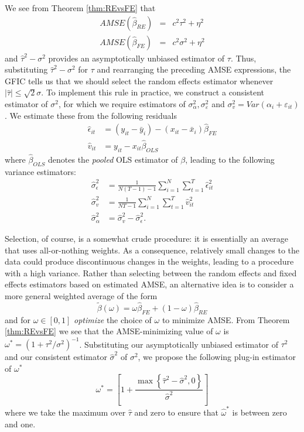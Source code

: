 We see from Theorem \ref{thm:REvsFE} that 
\begin{eqnarray}
  AMSE(\widehat{\beta}_{RE}) &=& c^2 \tau^2 + \eta^2 \\
  \label{eq:REAMSE}
  AMSE(\widehat{\beta}_{FE}) &=& c^2\sigma^2 + \eta^2  
  \label{eq:FEAMSE}
\end{eqnarray}
and $\widehat{\tau}^2 - \sigma^2$ provides an asymptotically unbiased estimator of $\tau$.
Thus, substituting $\widehat{\tau}^2 - \sigma^2$ for $\tau$ and rearranging the preceding AMSE expressions, the GFIC tells us that we should select the random effects estimator whenever $|\widehat{\tau}|\leq \sqrt{2} \sigma$.
To implement this rule in practice, we construct a consistent estimator of $\sigma^2$, for which we require estimators of $\sigma_{\alpha}^2, \sigma_{\varepsilon}^2$ and $\sigma_{v}^2 = Var(\alpha_i + \varepsilon_{it})$.
We estimate these from the following residuals
\begin{align*}
\widehat{\epsilon}_{it}& = (y_{it} -\bar{y}_i) - (x_{it} - \bar{x}_i) \widehat{\beta}_{FE}\\
\widehat{v}_{it} &= y_{it} - x_{it} \widehat{\beta}_{OLS}
\end{align*} 
where $\widehat{\beta}_{OLS}$ denotes the \emph{pooled} OLS estimator of $\beta$, leading to the following variance estimators: 
\begin{align*}
\widehat{\sigma}_\epsilon^2 &= \frac{1}{N(T-1)-1} \sum_{i=1}^N \sum_{t=1}^T \widehat{\epsilon}_{it}^2\\
\widehat{\sigma}_v^2 &= \frac{1}{NT-1} \sum_{i=1}^N \sum_{t=1}^T \widehat{v}_{it}^2\\
\widehat{\sigma}_\alpha^2 &= \widehat{\sigma}_v^2 - \widehat{\sigma}_\epsilon^2.
\end{align*}

Selection, of course, is a somewhat crude procedure: it is essentially an average that uses all-or-nothing weights.
As a consequence, relatively small changes to the data could produce discontinuous changes in the weights, leading to a procedure with a high variance.
Rather than selecting between the random effects and fixed effects estimators based on estimated AMSE, an alternative idea is to consider a more general weighted average of the form
\[\widetilde{\beta}(\omega) =  \omega \widehat{\beta}_{FE} + (1 - \omega)\widehat{\beta}_{RE}\]
and for $\omega \in [0,1]$ \emph{optimize} the choice of $\omega$ to minimize AMSE. 
From Theorem \ref{thm:REvsFE} we see that the AMSE-minimizing value of $\omega$ is $\omega^* = (1 + \tau^2/\sigma^2)^{-1}$.
Substituting our asymptotically unbiased estimator of $\tau^2$ and our consistent estimator $\widehat{\sigma}^2$ of $\sigma^2$, we propose the following plug-in estimator of $\omega^*$ 
\begin{equation*}
  \omega^* = \left[ 1 + \frac{ \max\left\{  \widehat{\tau}^2 - \widehat{\sigma}^2, 0\right\}}{\widehat{\sigma}^2} \right]
\end{equation*}
where we take the maximum over $\widehat{\tau}$ and zero to ensure that $\widehat{\omega}^*$ is between zero and one. 
